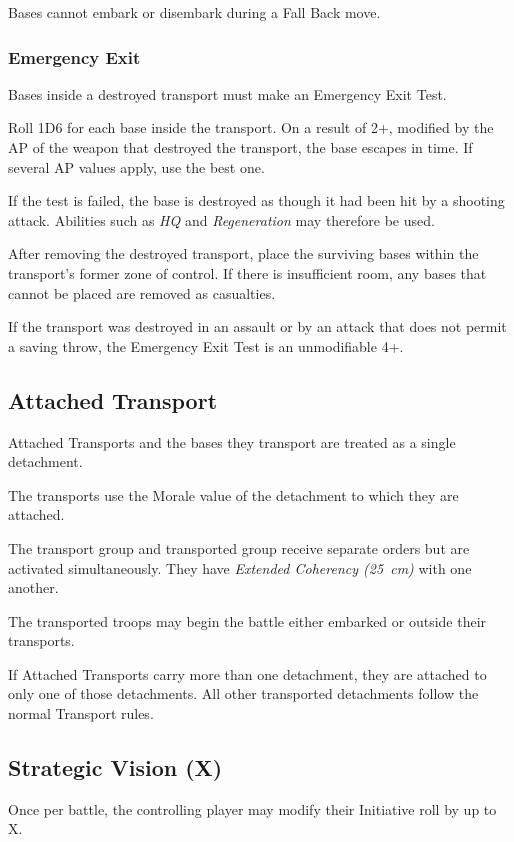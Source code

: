 Bases cannot embark or disembark during a Fall Back move.

\subsubsection{Emergency Exit}

Bases inside a destroyed transport must make an Emergency Exit Test.

Roll 1D6 for each base inside the transport. On a result of 2+, modified by the AP of the weapon that destroyed the transport, the base escapes in time. If several AP values apply, use the best one.

If the test is failed, the base is destroyed as though it had been hit by a shooting attack. Abilities such as \textit{HQ} and \textit{Regeneration} may therefore be used.

After removing the destroyed transport, place the surviving bases within the transport's former zone of control. If there is insufficient room, any bases that cannot be placed are removed as casualties.

If the transport was destroyed in an assault or by an attack that does not permit a saving throw, the Emergency Exit Test is an unmodifiable 4+.

\subsection{Attached Transport}

Attached Transports and the bases they transport are treated as a single detachment.

The transports use the Morale value of the detachment to which they are attached.

The transport group and transported group receive separate orders but are activated simultaneously. They have \textit{Extended Coherency (25~cm)} with one another.

The transported troops may begin the battle either embarked or outside their transports.

If Attached Transports carry more than one detachment, they are attached to only one of those detachments. All other transported detachments follow the normal Transport rules.

\subsection{Strategic Vision (X)}

Once per battle, the controlling player may modify their Initiative roll by up to X.

